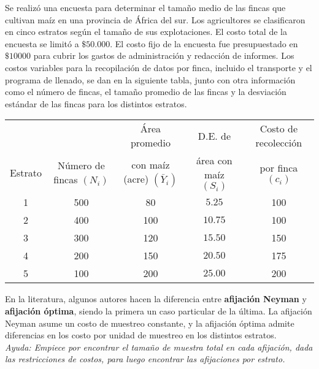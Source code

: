 \addpoints
\question[30] Se realizó una encuesta para determinar el tamaño medio de las fincas que cultivan maíz en una provincia de África del sur.  Los agricultores se clasificaron en cinco estratos según el tamaño de sus explotaciones. El costo total de la encuesta se limitó a $\$50.000$. El costo fijo de la encuesta fue presupuestado en $\$10000$ para cubrir los gastos de administración y redacción de informes. Los costos variables para la recopilación de datos por finca, incluido el transporte y el programa de llenado, se dan en la siguiente tabla, junto con otra información como el número de fincas, el tamaño promedio de las fincas y la desviación estándar de las fincas para los distintos estratos.

\noaddpoints
{}
\begin{center}
\begin{tabular}{ccccc} 
&  & Área promedio & D.E. de & Costo de recolección \\
Estrato & Número de fincas $\left(N_{i}\right)$ & con maíz (acre) $\left(\bar{Y}_{i}\right)$ & área con maíz $\left(S_{i}\right)$ & por finca $\left(c_{i}\right)$ \\
\hline 1 & 500 & 80 & $5.25$ & 100 \\
2 & 400 & 100 & $10.75$ & 100 \\
3 & 300 & 120 & $15.50$ & 150 \\
4 & 200 & 150 & $20.50$ & 175 \\
5 & 100 & 200 & $25.00$ & 200
\end{tabular}
\end{center}

En la literatura, algunos autores hacen la diferencia entre \textbf{afijación Neyman} y \textbf{afijación óptima}, siendo la primera un caso particular de la última. La afijación Neyman asume un costo de muestreo constante, y la afijación óptima admite diferencias en los costo por unidad de muestreo en los distintos estratos. \\
\textit{Ayuda: Empiece por encontrar el tamaño de muestra total en cada afijación, dada las restricciones de costos, para luego encontrar las afijaciones por estrato.}

